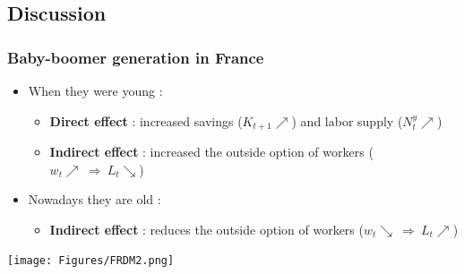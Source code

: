 \documentclass{beamer}
\begin{document}
		\subsection{Discussion}
			\begin{frame}\frametitle{Baby-boomer generation in France}
				\begin{minipage}[h]{.49\textwidth}
					\begin{itemize}
						\item When they were young :
						\begin{itemize}
							\item \textbf{Direct effect} : increased savings ($K_{t+1} \nearrow$) and labor supply ($N^y_t \nearrow$)
							\item \textbf{Indirect effect} : increased the outside option of workers ($w_t \nearrow ~ \Rightarrow ~ L_t \searrow$)
						\end{itemize}
						\item Nowadays they are old :
						\begin{itemize}
							\item \textbf{Indirect effect} : reduces the outside option of workers ($w_t \searrow ~ \Rightarrow ~ L_t \nearrow$)
						\end{itemize}
					\end{itemize}
				\end{minipage}
				\begin{minipage}[h]{.49\textwidth}
					\texttt{[image: Figures/FRDM2.png]}
				\end{minipage}
			\end{frame}
				
\end{document}
